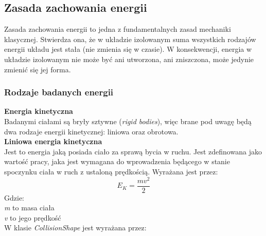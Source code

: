 \subsection{Zasada zachowania energii}
Zasada zachowania energii to jedna z fundamentalnych zasad mechaniki klasycznej.
Stwierdza ona, że w układzie izolowanym suma wszystkich rodzajów energii układu
jest stała (nie zmienia się w czasie). W konsekwencji, energia w układzie
izolowanym nie może być ani utworzona, ani zniszczona, może jedynie zmienić się
jej forma.\\

\subsubsection{Rodzaje badanych energii}

\textbf{Energia kinetyczna}\\
Badanymi ciałami są bryły sztywne (\emph{rigid bodies}), więc brane
pod uwagę będą dwa rodzaje energii kinetycznej: liniowa oraz obrotowa.\\

\textbf{Liniowa energia kinetyczna}\\
Jest to energia jaką posiada ciało za sprawą bycia w ruchu. Jest zdefinowana
jako wartość pracy, jaka jest wymagana do wprowadzenia będącego w stanie
spoczynku ciała w ruch z ustaloną prędkością. Wyrażana jest przez:
\begin{equation}
E_{K} = \frac{mv^{2}}{2}
\end{equation}
Gdzie:\\
\emph{m} to masa ciała\\
\emph{v} to jego prędkość\\
W klasie \emph{CollisionShape} jest wyrażana przez:




